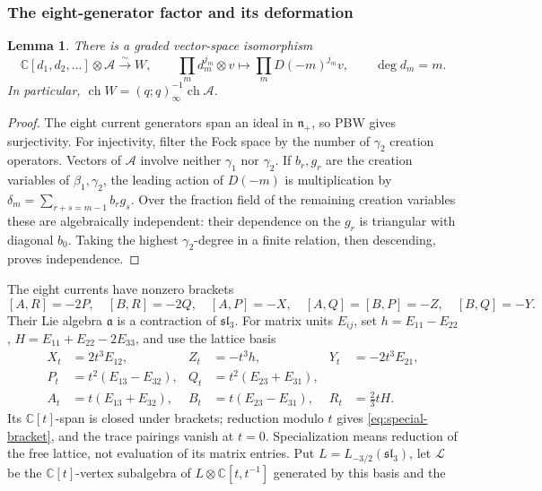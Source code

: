 \documentclass[11pt]{amsart}
\newtheorem{lemma}[theorem]{Lemma}
\theoremstyle{definition}
\theoremstyle{remark}
\newcommand{\C}{\mathbb C}
\newcommand{\n}{\mathfrak n_+}
\DeclareMathOperator{\ch}{ch}
\newcommand{\slthree}{\mathfrak{sl}_3}
\begin{document}
\subsubsection{The eight-generator factor and its deformation}
\begin{lemma}\label{lem:free-D-factor}
There is a graded vector-space isomorphism
\[
 \C[d_1,d_2,\ldots]\otimes\mathcal A\xrightarrow{\sim}W,
 \qquad \prod_m d_m^{j_m}\otimes v\longmapsto
 \prod_mD(-m)^{j_m}v,\qquad\deg d_m=m.
\]
In particular, $\ch W=(q;q)_\infty^{-1}\ch\mathcal A$.
\end{lemma}
\begin{proof}
The eight current generators span an ideal in $\n$, so PBW gives
surjectivity. For injectivity, filter the Fock space by the number of
$\gamma_2$ creation operators. Vectors of $\mathcal A$ involve neither
$\gamma_1$ nor $\gamma_2$. If $b_r,g_r$ are the creation variables of
$\beta_1,\gamma_2$, the leading action of $D(-m)$ is multiplication by
$\delta_m=\sum_{r+s=m-1}b_rg_s$. Over the fraction field of the remaining
creation variables these are algebraically independent: their dependence
on the $g_r$ is triangular with diagonal $b_0$. Taking the highest
$\gamma_2$-degree in a finite relation, then descending, proves independence.
\end{proof}
The eight currents have nonzero brackets
\begin{equation}\label{eq:special-bracket}
 [A,R]=-2P,\quad[B,R]=-2Q,\quad[A,P]=-X,\quad
 [A,Q]=[B,P]=-Z,\quad[B,Q]=-Y.
\end{equation}
Their Lie algebra $\mathfrak a$ is a contraction of $\slthree$.
For matrix units $E_{ij}$, set $h=E_{11}-E_{22}$,
$H=E_{11}+E_{22}-2E_{33}$, and use the lattice basis
\begin{equation}\label{eq:matrix-basis}
\begin{aligned}
 X_t&=2t^3E_{12},&Z_t&=-t^3h,&Y_t&=-2t^3E_{21},\\
 P_t&=t^2(E_{13}-E_{32}),&Q_t&=t^2(E_{23}+E_{31}),\\
 A_t&=t(E_{13}+E_{32}),&B_t&=t(E_{23}-E_{31}),&R_t&=\tfrac23tH.
\end{aligned}
\end{equation}
Its $\C[t]$-span is closed under brackets; reduction modulo $t$ gives
\eqref{eq:special-bracket}, and the trace pairings vanish at $t=0$.
Specialization means reduction of the free lattice, not evaluation of
its matrix entries.
Put $L=L_{-3/2}(\slthree)$, let $\mathscr L$ be the $\C[t]$-vertex
subalgebra of $L\otimes\C[t,t^{-1}]$ generated by this basis and the
\end{document}
